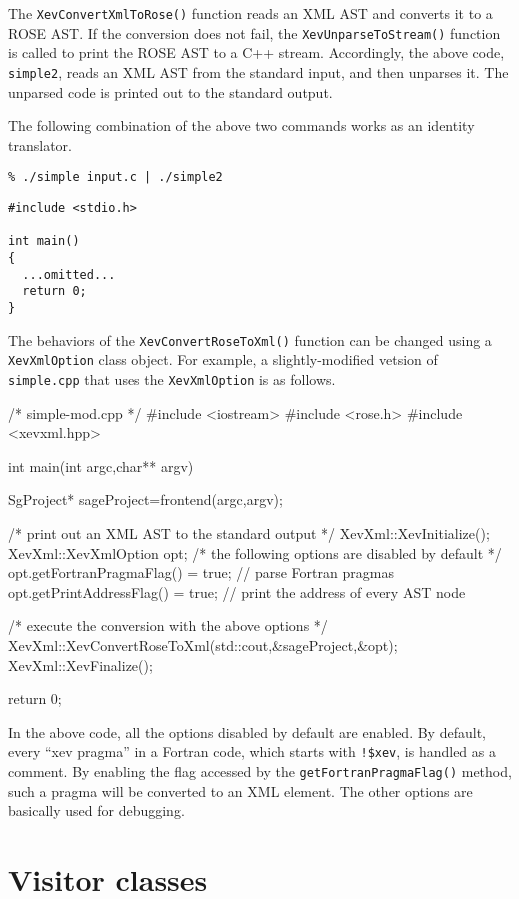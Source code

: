 The \texttt{XevConvertXmlToRose()} function reads an XML AST and
converts it to a ROSE AST. If the conversion does not fail, the
\texttt{XevUnparseToStream()} function is called to print the ROSE AST
to a C++ stream.  Accordingly, the above code, \texttt{simple2}, reads
an XML AST from the standard input, and then unparses it. The unparsed
code is printed out to the standard output.

The following combination of the above two commands works as an identity
translator.

\vspace{5mm}
\texttt{\% ./simple input.c | ./simple2 }
\begin{verbatim}
#include <stdio.h>

int main()
{
  ...omitted...
  return 0;
}
\end{verbatim}


The behaviors of the \texttt{XevConvertRoseToXml()} function can be
changed using a \texttt{XevXmlOption} class object. For example, a
slightly-modified vetsion of \texttt{simple.cpp} that uses the
\texttt{XevXmlOption} is as follows.
\begin{framed}
\begin{src}
/* simple-mod.cpp */
#include <iostream>
#include <rose.h>
#include <xevxml.hpp>

int main(int argc,char** argv){
  SgProject* sageProject=frontend(argc,argv);

  /* print out an XML AST to the standard output */
  XevXml::XevInitialize();
  XevXml::XevXmlOption opt;
  /* the following options are disabled by default */
  opt.getFortranPragmaFlag() = true; // parse Fortran pragmas
  opt.getPrintAddressFlag() = true; // print the address of every AST node

  /* execute the conversion with the above options */
  XevXml::XevConvertRoseToXml(std::cout,&sageProject,&opt);
  XevXml::XevFinalize();

  return 0;
}
\end{src}
\end{framed}

In the above code, all the options disabled by default are enabled.  By
default, every ``xev pragma'' in a Fortran code, which starts with
\texttt{!\$xev}, is handled as a comment.  By enabling the flag accessed
by the \texttt{getFortranPragmaFlag()} method, such a pragma will be
converted to an XML element. The other options are basically used for
debugging.

\section{Visitor classes}

